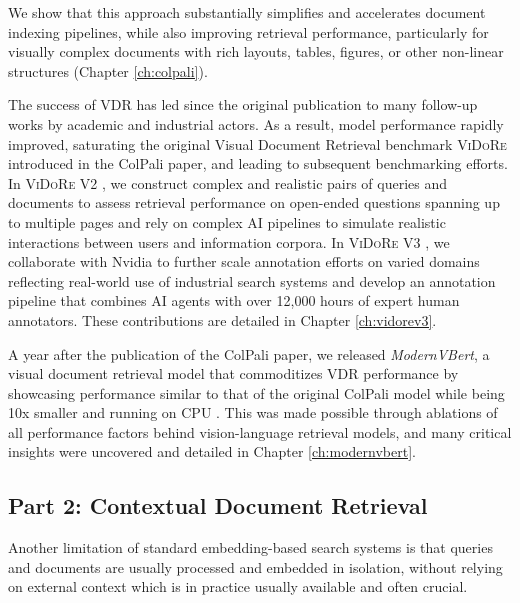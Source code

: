 We show that this approach substantially simplifies and accelerates document indexing pipelines, while also improving retrieval performance, particularly for visually complex documents with rich layouts, tables, figures, or other non-linear structures (Chapter \autoref{ch:colpali}).

The success of VDR has led since the original publication to many follow-up works by academic and industrial actors. As a result, model performance rapidly improved, saturating the original Visual Document Retrieval benchmark \textsc{ViDoRe} introduced in the ColPali paper, and leading to subsequent benchmarking efforts. In \textsc{ViDoRe} V2 , we construct complex and realistic pairs of queries and documents to assess retrieval performance on open-ended questions spanning up to multiple pages and rely on complex AI pipelines to simulate realistic interactions between users and information corpora. In \textsc{ViDoRe} V3 , we collaborate with Nvidia to further scale annotation efforts on varied domains reflecting real-world use of industrial search systems and develop an annotation pipeline that combines AI agents with over 12,000 hours of expert human annotators. These contributions are detailed in Chapter \autoref{ch:vidorev3}.

A year after the publication of the ColPali paper, we released \emph{ModernVBert}, a visual document retrieval model that commoditizes VDR performance by showcasing performance similar to that of the original ColPali model while being 10x smaller and running on CPU . This was made possible through ablations of all performance factors behind vision-language retrieval models, and many critical insights were uncovered and detailed in Chapter \autoref{ch:modernvbert}.


\subsection{Part 2: Contextual Document Retrieval}

Another limitation of standard embedding-based search systems is that queries and documents are usually processed and embedded in isolation, without relying on external context which is in practice usually available and often crucial.

